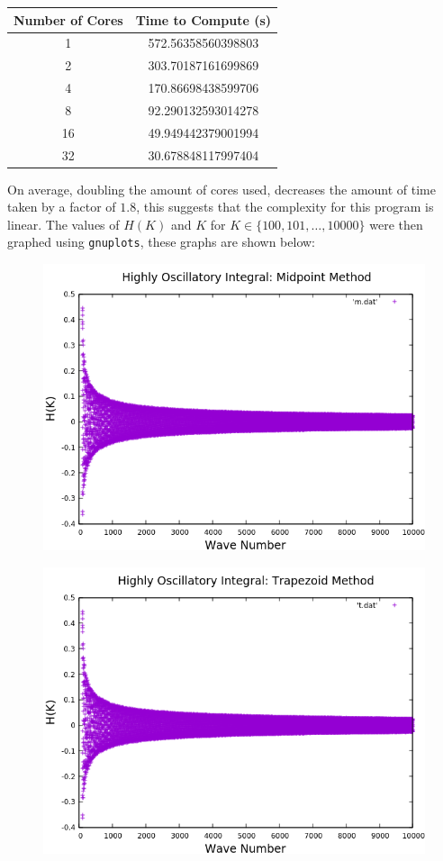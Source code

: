 \documentclass{article}
\theoremstyle{remark}
\theoremstyle{remark}
\begin{document}
	\begin{table}[H]
		\begin{tabular}{cc}
			\toprule[0.5mm]
			Number of Cores & Time to Compute (s) \\ 
			\midrule
			 1 & 572.56358560398803 \\
			 2 & 303.70187161699869 \\
			 4 & 170.86698438599706 \\
			 8 & 92.290132593014278 \\
			16 & 49.949442379001994 \\
			32 & 30.678848117997404 \\
			\bottomrule[0.5mm]
		\end{tabular}
	\end{table}
	On average, doubling the amount of cores used, decreases the amount of time taken by a factor of $1.8$, this suggests that the complexity for this program is linear. The values of $H(K)$ and $K$ for $K\in\{100,101,\dots,10000\}$ were then graphed using \verb!gnuplots!, these graphs are shown below: \par
	\begin{figure}[H]\centering
		\includegraphics[scale=0.4]{m.png}
	\end{figure}
	\begin{figure}[H]\centering
		\includegraphics[scale=0.4]{t.png}
	\end{figure}
\end{document}
